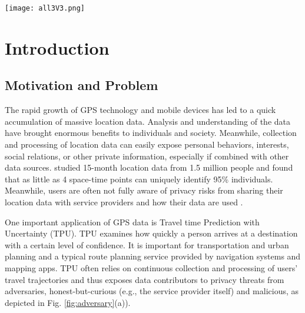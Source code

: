 \documentclass[10pt,journal,compsoc]{IEEEtran}
\begin{document}
\begin{figure*}[!t]
\centering \texttt{[image: all3V3.png]}
\vspace{-18pt}
\caption{Privacy Protection Strategies for Analysis using GPS Data }\label{fig:adversary}\vspace{-12pt}\end{figure*}  

\vspace{-12pt}
\section{Introduction}\label{sec:intro}\vspace{-3pt}
\subsection{Motivation and Problem}\label{sec:problem}
\vspace{-3pt}
The rapid growth of GPS technology and mobile devices has led to a quick accumulation of massive location data. Analysis and understanding of the data have brought enormous benefits to individuals and society.  Meanwhile, collection and processing of location data can easily expose personal behaviors, interests, social relations, or other private information, especially if combined with other data sources. \citet{de2013unique} studied 15-month location data from 1.5 million people and found that as little as 4 space-time points can uniquely identify 95\% individuals.  Meanwhile, users are often not fully aware of privacy risks from sharing their location data with service providers and how their data are used \cite{coppens2014privacy, kessler2018geoprivacy}.

One  important application of GPS data is Travel time Prediction with Uncertainty (TPU). TPU examines how quickly a person arrives at a destination with a certain level of confidence. It is important for transportation and urban planning  and a typical route planning service provided by navigation systems and mapping apps.  TPU often relies on continuous collection and processing of users' travel trajectories and  thus exposes data contributors to privacy threats from adversaries, honest-but-curious (e.g., the service provider itself) and malicious, as depicted in Fig. \ref{fig:adversary}(a)). 
\end{document}
